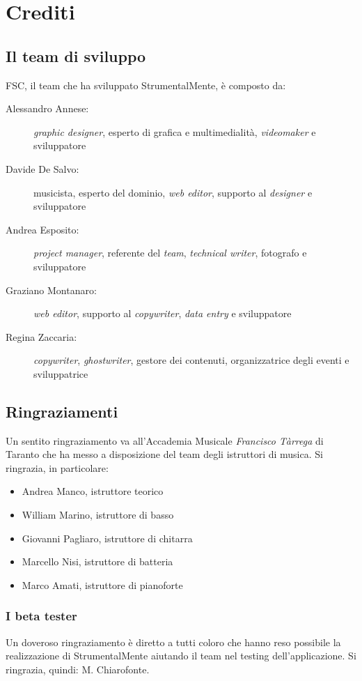 %
%

\chapter{Crediti}
\section{Il team di sviluppo}

FSC, il team che ha sviluppato StrumentalMente, è composto da:
\begin{description}
    \item[Alessandro Annese:] \textit{graphic designer}, esperto di grafica e multimedialità, \textit{videomaker} e sviluppatore
    \item[Davide De Salvo:] musicista, esperto del dominio, \textit{web editor}, supporto al \textit{designer} e sviluppatore
    \item[Andrea Esposito:] \textit{project manager}, referente del \textit{team}, \textit{technical writer}, fotografo e sviluppatore
    \item[Graziano Montanaro:] \textit{web editor}, supporto al \textit{copywriter}, \textit{data entry} e sviluppatore
    \item[Regina Zaccaria:] \textit{copywriter}, \textit{ghostwriter}, gestore dei contenuti, organizzatrice degli eventi e sviluppatrice
\end{description}

\section{Ringraziamenti}
Un sentito ringraziamento va all'Accademia Musicale \textit{Francisco Tàrrega} di Taranto che ha messo a disposizione del team degli istruttori di musica. Si ringrazia, in particolare:
\begin{itemize}
    \item Andrea Manco, istruttore teorico
    \item William Marino, istruttore di basso
    \item Giovanni Pagliaro, istruttore di chitarra
    \item Marcello Nisi, istruttore di batteria
    \item Marco Amati, istruttore di pianoforte
\end{itemize}
\subsection{I beta tester}
Un doveroso ringraziamento è diretto a tutti coloro che hanno reso possibile la realizzazione di StrumentalMente aiutando il team nel testing dell'applicazione. Si ringrazia, quindi: M. Chiarofonte.